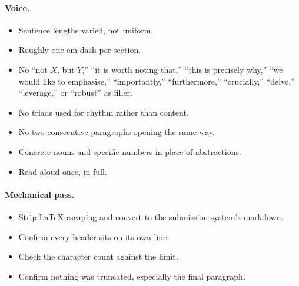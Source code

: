 \paragraph{Voice.}
\begin{itemize}
    \item Sentence lengths varied, not uniform.
    \item Roughly one em-dash per section.
    \item No ``not $X$, but $Y$,'' ``it is worth noting that,'' ``this is precisely why,'' ``we would like to emphasise,'' ``importantly,'' ``furthermore,'' ``crucially,'' ``delve,'' ``leverage,'' or ``robust'' as filler.
    \item No triads used for rhythm rather than content.
    \item No two consecutive paragraphs opening the same way.
    \item Concrete nouns and specific numbers in place of abstractions.
    \item Read aloud once, in full.
\end{itemize}

\paragraph{Mechanical pass.}
\begin{itemize}
    \item Strip \LaTeX{} escaping and convert to the submission system's markdown.
    \item Confirm every header sits on its own line.
    \item Check the character count against the limit.
    \item Confirm nothing was truncated, especially the final paragraph.
\end{itemize}
